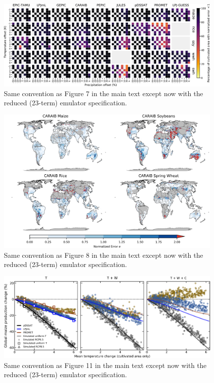 \documentclass[10pt]{article}
\begin{document}
{{\begin{figure}[h!]
  \centering
  \includegraphics[width=15.5cm]{reduced_error_grid.png}
  \caption{
  Same convention as Figure 7 in the main text except now with the reduced (23-term) emulator specification.
  }
  \label{fig:reducedgrid}
\end{figure}

\begin{figure}[h!]
  \centering
  \includegraphics[width=15.5cm]{reduced_CARAIB_spatial_error.png}
  \caption{
  Same convention as Figure 8 in the main text except now with the reduced (23-term) emulator specification.
  }
  \label{fig:reducedcaraib}
\end{figure}

\begin{figure}[h!]
  \centering
  \includegraphics[width = 16.3cm]{reduced_global_em_maize.png}
  \caption{
  Same convention as Figure 11 in the main text except now with the reduced (23-term) emulator specification.
  }
\end{figure}

}}
\end{document}
